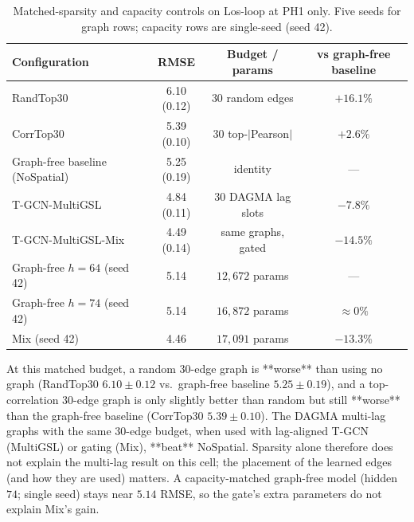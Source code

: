 \begin{table}[t]
\centering
\caption{Matched-sparsity and capacity controls on Los-loop at PH1 only.
Five seeds for graph rows; capacity rows are single-seed (seed 42).}
\label{tab:controls}
\small
\begin{tabular}{lccc}
\toprule
Configuration & RMSE & Budget / params & vs graph-free baseline \\
\midrule
RandTop30 & 6.10 (0.12) & 30 random edges & $+16.1\%$ \\
CorrTop30 & 5.39 (0.10) & 30 top-$|$Pearson$|$ & $+2.6\%$ \\
Graph-free baseline (NoSpatial) & 5.25 (0.19) & identity & --- \\
T-GCN-MultiGSL & 4.84 (0.11) & 30 DAGMA lag slots & $-7.8\%$ \\
T-GCN-MultiGSL-Mix & 4.49 (0.14) & same graphs, gated & $-14.5\%$ \\
\midrule
Graph-free $h{=}64$ (seed 42) & 5.14 & $12{,}672$ params & --- \\
Graph-free $h{=}74$ (seed 42) & 5.14 & $16{,}872$ params & $\approx 0\%$ \\
Mix (seed 42) & 4.46 & $17{,}091$ params & $-13.3\%$ \\
\bottomrule
\end{tabular}
\end{table}

At this matched budget, a random $30$-edge graph is **worse** than using
no graph (RandTop30 $6.10\pm 0.12$ vs.\ graph-free baseline $5.25\pm 0.19$), and a
top-correlation $30$-edge graph is only slightly better than random but
still **worse** than the graph-free baseline (CorrTop30 $5.39\pm 0.10$). The DAGMA
multi-lag graphs with the same $30$-edge budget, when used with
lag-aligned T-GCN (MultiGSL) or gating (Mix), **beat** NoSpatial. Sparsity
alone therefore does not explain the multi-lag result on this cell; the
placement of the learned edges (and how they are used) matters. A
capacity-matched graph-free model (hidden $74$; single seed) stays near
$5.14$ RMSE, so the gate's extra parameters do not explain Mix's gain.

